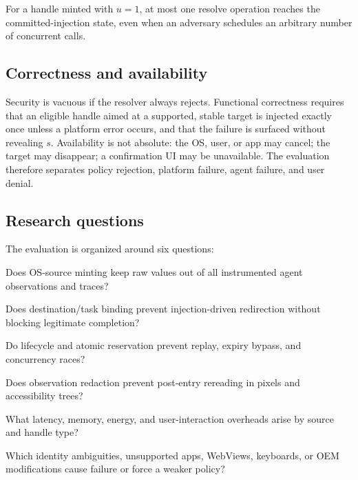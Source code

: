 \begin{definition}
For a handle minted with $u=1$, at most one resolve operation reaches the committed-injection state, even when an adversary schedules an arbitrary number of concurrent calls.
\end{definition}

\subsection{Correctness and availability}

Security is vacuous if the resolver always rejects. Functional correctness requires that an eligible handle aimed at a supported, stable target is injected exactly once unless a platform error occurs, and that the failure is surfaced without revealing $s$. Availability is not absolute: the OS, user, or app may cancel; the target may disappear; a confirmation UI may be unavailable. The evaluation therefore separates policy rejection, platform failure, agent failure, and user denial.

\subsection{Research questions}

The evaluation is organized around six questions:

\begin{description}[leftmargin=1.5cm,style=nextline]
\item[RQ1] Does OS-source minting keep raw values out of all instrumented agent observations and traces?
\item[RQ2] Does destination/task binding prevent injection-driven redirection without blocking legitimate completion?
\item[RQ3] Do lifecycle and atomic reservation prevent replay, expiry bypass, and concurrency races?
\item[RQ4] Does observation redaction prevent post-entry rereading in pixels and accessibility trees?
\item[RQ5] What latency, memory, energy, and user-interaction overheads arise by source and handle type?
\item[RQ6] Which identity ambiguities, unsupported apps, WebViews, keyboards, or OEM modifications cause failure or force a weaker policy?
\end{description}
